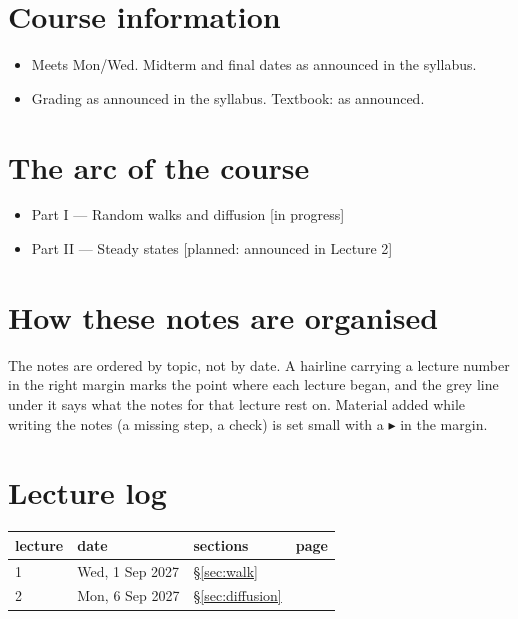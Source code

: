 \documentclass[11pt]{article}
\begin{document}
\makelecheader

\section*{Course information}
\begin{itemize}[leftmargin=1.2em,itemsep=1pt,topsep=3pt]
  \item Meets Mon/Wed. Midterm and final dates as announced in the syllabus.
  \item Grading as announced in the syllabus. Textbook: as announced.
\end{itemize}

\section*{The arc of the course}
\begin{itemize}[leftmargin=1.2em,itemsep=1pt,topsep=3pt]
  \item Part I --- Random walks and diffusion \hfill {\small[in progress]}
  \item Part II --- Steady states \hfill {\small[planned: announced in Lecture 2]}
\end{itemize}

\section*{How these notes are organised}
The notes are ordered by topic, not by date. A hairline carrying a lecture
number in the right margin marks the point where each lecture began, and the
grey line under it says what the notes for that lecture rest on. Material
added while writing the notes (a missing step, a check) is set small with a
$\blacktriangleright$ in the margin.

\section*{Lecture log}
{\small
\begin{longtable}{@{}l l l r@{}}
\toprule
lecture & date & sections & page\\
\midrule
\endhead
1 & Wed, 1 Sep 2027 & \S\ref{sec:walk} & \pageref{lec:2027-09-01}\\
2 & Mon, 6 Sep 2027 & \S\ref{sec:diffusion} & \pageref{lec:2027-09-06}\\
\bottomrule
\end{longtable}}
\end{document}
